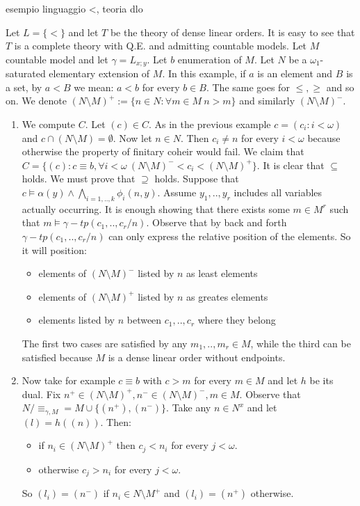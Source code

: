 \documentclass[../main.tex]{subfiles}
\begin{document}
\begin{example}
	esempio linguaggio <, teoria dlo

	Let $L = \{<\}$ and let $T$ be the theory of dense linear orders.
	It is easy to see that $T$ is a complete theory with Q.E. and admitting countable models.
	Let $M$ countable model and let $\gamma = L_{x;y}$. Let $b$ enumeration of $M$. Let $N$ be a $\omega_1$-saturated elementary extension of $M$.
	In this example, if $a$ is an element and $B$ is a set, by $a < B$ we mean: $a < b$ for every $b \in B$. The same goes for $\leq, \geq$ and so on.
	We denote $(N \setminus M) ^+ := \{n \in N : \forall m \in M \ n > m\}$ and similarly $(N \setminus M) ^-$.

	\begin{enumerate}
			\item	We compute $C$. Let $(c) \in C$. As in the previous example $c = (c_i : i < \omega)$ and $c \cap (N \setminus M) = \emptyset$.
				Now let $n \in N$. Then $c_i \not = n$ for every $i < \omega$ because otherwise the property of finitary coheir would fail.
				We claim that $C = \{(c) : c \equiv b, \forall i < \omega \ (N \setminus M) ^- < c_i < (N \setminus M) ^+\}$.
				It is clear that $\subseteq$ holds. We must prove that $\supseteq$ holds.
				Suppose that $c \models \alpha(y) \land \bigwedge_{i=1,..,k} \phi_i(n,y)$. Assume $y_1,..,y_r$ includes all variables actually occurring.
				It is enough showing that there exists some $m \in M^r$ such that $m \models \gamma-tp(c_1,..,c_r /n)$.
				Observe that by back and forth $\gamma-tp(c_1,..,c_r/n)$ can only express the relative position of the elements.
				So it will position:
				\begin{itemize}
					\item	elements of $(N \setminus M) ^-$ listed by $n$ as least elements
					\item	elements of $(N \setminus M) ^+$ listed by $n$ as greates elements
					\item	elements listed by $n$ between $c_1,..,c_r$ where they belong
				\end{itemize}
				The first two cases are satisfied by any $m_1,..,m_r \in M$, while the third can be satisfied because $M$ is a dense linear order without endpoints.
			
			\item	Now take for example $c \equiv b$ with $c > m$ for every $m \in M$ and let $h$ be its dual. 
				Fix $n^+ \in (N \setminus M) ^+, n^- \in (N \setminus M) ^-, m \in M$.
				Observe that $N / \equiv_{\gamma,M} = M \cup \{(n^+),(n^-)\}$.
				Take any $n \in N^x$ and let $(l) = h((n))$. Then:
				\begin{itemize}
					\item	if $n_i \in (N \setminus M) ^+$ then $c_j < n_i$ for every $j < \omega$.
					\item	otherwise $c_j > n_i$ for every $j < \omega$.
				\end{itemize}
				So $(l_i) = (n^-)$ if $n_i \in N \setminus M ^+$ and $(l_i) = (n^+)$ otherwise.


\end{enumerate}
\end{example}
\end{document}
